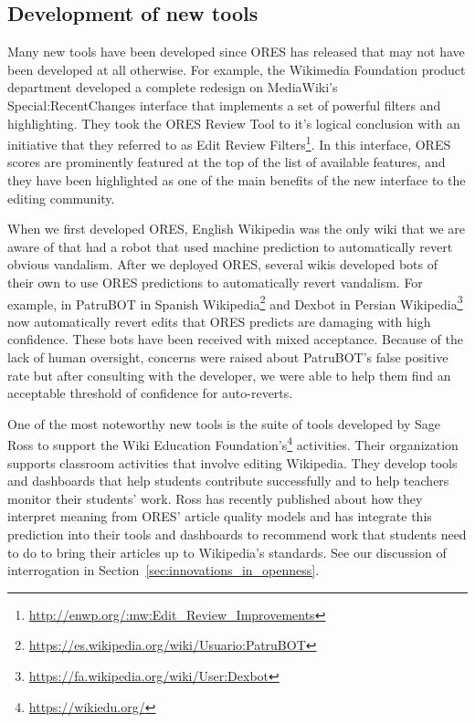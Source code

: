 \subsection{Development of new tools}

Many new tools have been developed since ORES has released that may not have been developed at all otherwise.  For example, the Wikimedia Foundation product department developed a complete redesign on MediaWiki's Special:RecentChanges interface that implements a set of powerful filters and highlighting.  They took the ORES Review Tool to it's logical conclusion with an initiative that they referred to as Edit Review Filters\footnote{\url{http://enwp.org/:mw:Edit_Review_Improvements}}.  In this interface, ORES scores are prominently featured at the top of the list of available features, and they have been highlighted as one of the main benefits of the new interface to the editing community.

When we first developed ORES, English Wikipedia was the only wiki that we are aware of that had a robot that used machine prediction to automatically revert obvious vandalism\cite{carter2008cluebot}.  After we deployed ORES, several wikis developed bots of their own to use ORES predictions to automatically revert vandalism.  For example, in PatruBOT in Spanish Wikipedia\footnote{\url{https://es.wikipedia.org/wiki/Usuario:PatruBOT}} and Dexbot in Persian Wikipedia\footnote{\url{https://fa.wikipedia.org/wiki/User:Dexbot}} now automatically revert edits that ORES predicts are damaging with high confidence.  These bots have been received with mixed acceptance.  Because of the lack of human oversight, concerns were raised about PatruBOT's false positive rate but after consulting with the developer, we were able to help them find an acceptable threshold of confidence for auto-reverts.

One of the most noteworthy new tools is the suite of tools developed by Sage Ross to support the Wiki Education Foundation's\footnote{\url{https://wikiedu.org/}} activities.  Their organization supports classroom activities that involve editing Wikipedia.  They develop tools and dashboards that help students contribute successfully and to help teachers monitor their students' work.  Ross has recently published about how they interpret meaning from ORES' article quality models\cite{ross2016visualizing} and has integrate this prediction into their tools and dashboards to recommend work that students need to do to bring their articles up to Wikipedia's standards.  See our discussion of interrogation in Section~\ref{sec:innovations_in_openness}.
